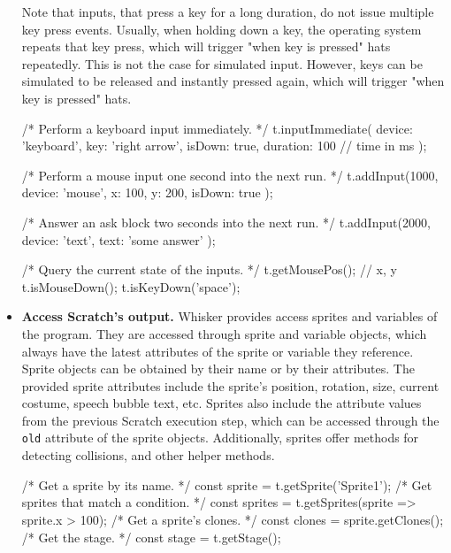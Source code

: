 \begin{itemize}
        Note that inputs, that press a key for a long duration, do not issue multiple key press events.
        Usually, when holding down a key, the operating system repeats that key press,
        which will trigger "when key is pressed" hats repeatedly.
        This is not the case for simulated input.
        However, keys can be simulated to be released and instantly pressed again,
        which will trigger "when key is pressed" hats.
        \begin{javascriptcode}
            /* Perform a keyboard input immediately. */
            t.inputImmediate({
                device: 'keyboard',
                key: 'right arrow',
                isDown: true,
                duration: 100 // time in ms
            });

            /* Perform a mouse input one second into the next run. */
            t.addInput(1000, { device: 'mouse', x: 100, y: 200, isDown: true });

            /* Answer an ask block two seconds into the next run. */
            t.addInput(2000, { device: 'text', text: 'some answer' });

            /* Query the current state of the inputs. */
            t.getMousePos(); // {x, y}
            t.isMouseDown();
            t.isKeyDown('space');
        \end{javascriptcode}
    \item \textbf{Access Scratch's output.}
        Whisker provides access sprites and variables of the program.
        They are accessed through sprite and variable objects, which always have the latest attributes of the sprite or variable they reference.
        Sprite objects can be obtained by their name or by their attributes.
        The provided sprite attributes include the sprite's position, rotation, size, current costume, speech bubble text, etc.
        Sprites also include the attribute values from the previous Scratch execution step,
        which can be accessed through the \texttt{old} attribute of the sprite objects.
        Additionally, sprites offer methods for detecting collisions, and other helper methods.
        \begin{javascriptcode}
            /* Get a sprite by its name. */
            const sprite = t.getSprite('Sprite1');
            /* Get sprites that match a condition. */
            const sprites = t.getSprites(sprite => sprite.x > 100);
            /* Get a sprite's clones. */
            const clones = sprite.getClones();
            /* Get the stage. */
            const stage = t.getStage();


\end{javascriptcode}
\end{itemize}
